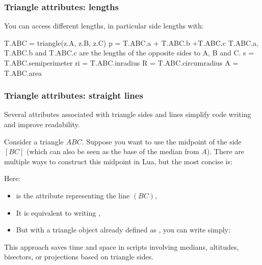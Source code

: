 \subsubsection{Triangle attributes: lengths}
\label{ssub:triangle_attributes_lengths}

You can access different lengths, in particular side lengths with:
\begin{mybox}
\begin{tkzexample}
  T.ABC = triangle(z.A, z.B, z.C)
  p = T.ABC.a + T.ABC.b +T.ABC.c %
  T.ABC.a, T.ABC.b and T.ABC.c are the lengths of the opposite sides to A, B and C.
  s = T.ABC.semiperimeter
  ri = T.ABC.inradius
  R = T.ABC.circumradius
  A = T.ABC.area
\end{tkzexample}
\end{mybox}

\subsubsection{Triangle attributes: straight lines}
\label{ssub:triangle_attributes_straight_lines}

Several attributes associated with triangle sides and lines simplify code writing and improve readability.

\medskip
\noindent
Consider a triangle $ABC$. Suppose you want to use the midpoint of the side $[BC]$ (which can also be seen as the base of the median from $A$). There are multiple ways to construct this midpoint in Lua, but the most concise is:

\begin{center}
\end{center}

\noindent
Here:
\begin{itemize}
  \item {} is the attribute representing the line $(BC)$,
  \item It is equivalent to writing ,
  \item But with a triangle object already defined as , you can write simply:
  \begin{center}
  \end{center}
\end{itemize}

\medskip
\noindent
This approach saves time and space in scripts involving medians, altitudes, bisectors, or projections based on triangle sides.

